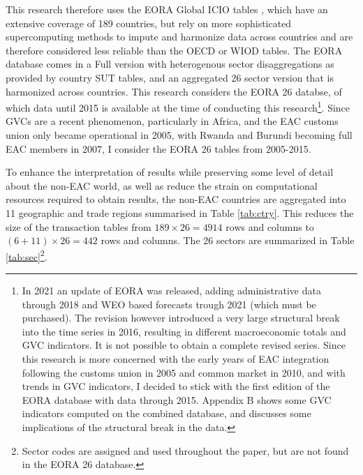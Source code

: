 \documentclass[a4paper]{article}
\begin{document}
This research therefore uses the EORA Global ICIO tables \citep{lenzen2012mapping, lenzen2013building}, which have an extensive coverage of 189 countries, but rely on more sophisticated supercomputing methods to impute and harmonize data across countries and are therefore considered less reliable than the OECD or WIOD tables. %
The EORA database comes in a Full version with heterogenous sector disaggregations as provided by country SUT tables, and an aggregated 26 sector version that is harmonized across countries. This research considers the EORA 26 databse, of which data until 2015 is available at the time of conducting this research\footnote{In 2021 an update of EORA was released, adding administrative data through 2018 and WEO based forecasts trough 2021 (which must be purchased). The revision however introduced a very large structural break into the time series in 2016, resulting in different macroeconomic totals and GVC indicators. It is not possible to obtain a complete revised series. Since this research is more concerned with the early years of EAC integration following the customs union in 2005 and common market in 2010, and with trends in GVC indicators, I decided to stick with the first edition of the EORA database with data through 2015. Appendix B shows some GVC indicators computed on the combined database, and discusses some implications of the structural break in the data. }. Since GVCs are a recent phenomenon, particularly in Africa, and the EAC customs union only became operational in 2005, with Rwanda and Burundi becoming full EAC members in 2007, I consider the EORA 26 tables from 2005-2015. \newline

To enhance the interpretation of results while preserving some level of detail about the non-EAC world, as well as reduce the strain on computational resources required to obtain results, the non-EAC countries are aggregated into 11 geographic and trade regions summarised in Table \ref{tab:ctry}. This reduces the size of the transaction tables from $189 \times 26 = 4914$ rows and columns to $(6 + 11)\times 26 = 442$ rows and columns. The 26 sectors are summarized in Table \ref{tab:sec}\footnote{Sector codes are assigned and used throughout the paper, but are not found in the EORA 26 database.}. \newline
\end{document}
